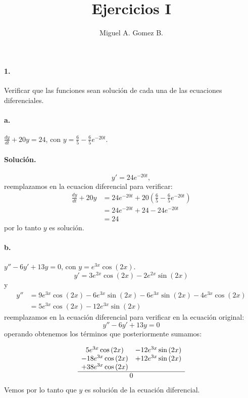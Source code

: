 \documentclass{article}
\title{Ejercicios I}
\author{Miguel A. Gomez B.}
\begin{document}
	\maketitle
\paragraph{1.} Verificar que las funciones sean solución de cada una de las ecuaciones diferenciales.

\paragraph{a.} $\frac{dy}{dt} + 20y = 24$, con $y = \frac{6}{5} - \frac{6}{5} e^{-20t}$.

\paragraph{Solución.}

$$y' = 24e^{-20t},$$
reemplazamos en la ecuacion diferencial para verificar:
\begin{align*}
	\frac{dy}{dt} + 20y &= 24e^{-20t} + 20\left(\frac{6}{5} - \frac{6}{5} e^{-20t}\right)\\
	&= 24e^{-20t} + 24 - 24e^{-20t}\\
	&= 24 
\end{align*}
por lo tanto $y$ es solución.
\paragraph{b.} $y'' - 6y' + 13y = 0$, con $y = e^{3x} \cos{(2x)}$.
$$y' = 3e^{2x}\cos{(2x)} - 2e^{2x}\sin{(2x)}$$
y
\begin{align*}
	y'' &= 9e^{3x}\cos{(2x)} - 6e^{3x}\sin{(2x)} - 6e^{3x}\sin{(2x)} - 4e^{3x}\cos{(2x)}\\
	&= 5e^{3x}\cos{(2x)} - 12e^{3x}\sin{(2x)}
\end{align*}
reemplazamos en la ecuación diferencial para verificar en la ecuación original:
$$y'' - 6y' + 13y = 0$$
operando obtenemos los términos que posteriormente sumamos:

\[
	\begin{array}{c c}
		  5e^{3x}\cos{(2x)}   & - 12e^{3x}\sin{(2x)} \\
		- 18e^{3x}\cos{(2x)} & + 12e^{3x}\sin{(2x)} \\
		+ 38e^{3x}\cos{(2x)} &\\
		\hline
		\multicolumn{2}{c}{0}
	\end{array}
\]
Vemos por lo tanto que $y$ es solución de la ecuación diferencial.
\end{document}
